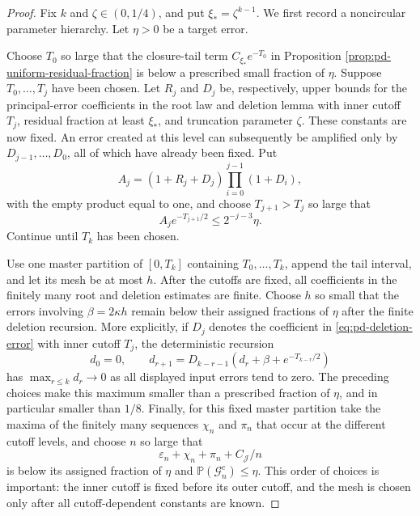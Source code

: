\documentclass[11pt]{article}
\theoremstyle{remark}
\newcommand{\Pp}{\mathbb P}
\begin{document}
\begin{proof}
Fix $k$ and $\zeta\in(0,1/4)$, and put
$\xi_*=\zeta^{k-1}$.  We first record a noncircular parameter hierarchy.
Let $\eta>0$ be a target error.

Choose $T_0$ so large that the closure-tail term
$C_{\xi_*}e^{-T_0}$ in Proposition
\ref{prop:pd-uniform-residual-fraction} is below a prescribed small fraction of
$\eta$.  Suppose $T_0,\ldots,T_j$ have been chosen.  Let $R_j$ and $D_j$ be,
respectively, upper bounds for the principal-error coefficients in the root law
and deletion lemma with inner cutoff $T_j$, residual fraction at least
$\xi_*$, and truncation parameter $\zeta$.  These constants are now fixed.  An
error created at this level can subsequently be amplified only by
$D_{j-1},\ldots,D_0$, all of which have already been fixed.  Put
\[
        A_j=(1+R_j+D_j)\prod_{i=0}^{j-1}(1+D_i),
\]
with the empty product equal to one, and choose $T_{j+1}>T_j$ so large that
\[
        A_je^{-T_{j+1}/2}\le 2^{-j-3}\eta.
\]
Continue until $T_k$ has been chosen.

Use one master partition of $[0,T_k]$ containing
$T_0,\ldots,T_k$, append the tail interval, and let its mesh be at most $h$.
After the cutoffs are fixed, all coefficients in the finitely many root and
deletion estimates are finite.  Choose $h$ so small that the errors involving
$\beta=2\kappa h$ remain below their assigned fractions of $\eta$ after the
finite deletion recursion.  More explicitly, if $D_j$ denotes the coefficient
in \eqref{eq:pd-deletion-error} with inner cutoff $T_j$, the deterministic
recursion
\[
        d_0=0,\qquad
        d_{r+1}=D_{k-r-1}(d_r+\beta+e^{-T_{k-r}/2})
\]
has $\max_{r\le k}d_r\to0$ as all displayed input errors tend to zero.
The preceding choices make this maximum smaller than a prescribed fraction of
$\eta$, and in particular smaller than $1/8$.  Finally, for this fixed master
partition take the maxima of the finitely many sequences $\chi_n$ and $\pi_n$
that occur at the different cutoff levels, and choose $n$ so large that
\[
        \varepsilon_n+\chi_n+\pi_n+C_{\mathcal J}/n
\]
is below its assigned fraction of $\eta$ and
$\Pp(\mathcal G_n^c)\le\eta$.  This order of choices is important: the inner
cutoff is fixed before its outer cutoff, and the mesh is chosen only after all
cutoff-dependent constants are known.


\end{proof}
\end{document}

